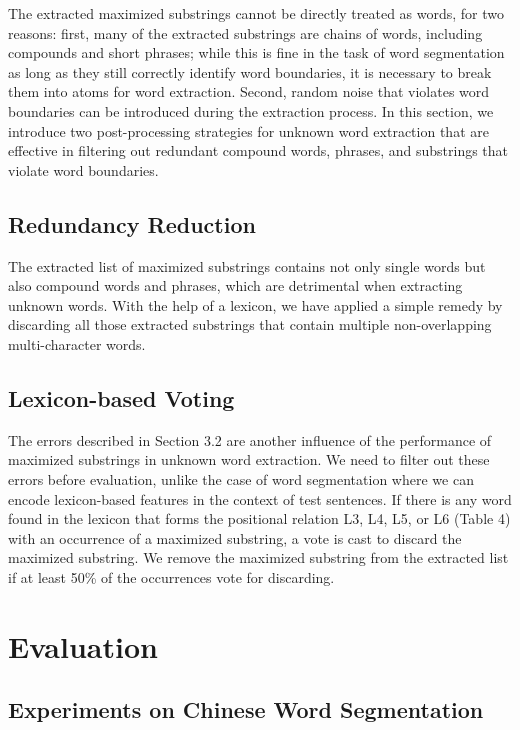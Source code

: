 \documentclass[english]{jnlp_1.4}
\begin{document}
The extracted maximized substrings cannot be directly treated as words, for two reasons: first, many of the extracted substrings are chains of words, including compounds and short phrases; while this is fine in the task of word segmentation as long as they still correctly identify word boundaries, it is necessary to break them into atoms for word extraction. Second, random noise that violates word boundaries can be introduced during the extraction process. In this section, we introduce two post-processing strategies for unknown word extraction that are effective in filtering out redundant compound words, phrases, and substrings that violate word boundaries.


\subsection{Redundancy Reduction}

The extracted list of maximized substrings contains not only single words but also compound words and phrases, which are detrimental when extracting unknown words. With the help of a lexicon, we have applied a simple remedy by discarding all those extracted substrings that contain multiple non-overlapping multi-character words.


\subsection{Lexicon-based Voting}

The errors described in Section 3.2 are another influence of the performance of maximized substrings in unknown word extraction. We need to filter out these errors before evaluation, unlike the case of word segmentation where we can encode lexicon-based features in the context of test sentences. If there is any word found in the lexicon that forms the positional relation L3, L4, L5, or L6 (Table 4) with an occurrence of a maximized substring, a vote is cast to discard the maximized substring. We remove the maximized substring from the extracted list if at least 50\% of the occurrences vote for discarding. 


\section{Evaluation}

\subsection{Experiments on Chinese Word Segmentation}
\end{document}
